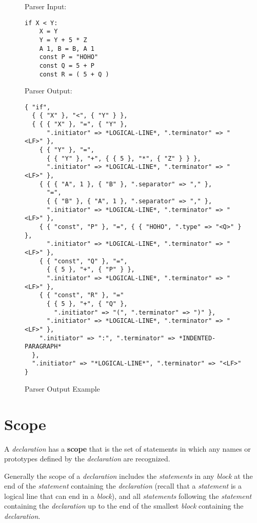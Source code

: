 \documentclass[12pt]{article}
\newcommand{\key}[1]{{\rm \bfseries #1}}
\newlength{\figurewidth}
\newenvironment{boxedfigure}[1][!btp]%
	{\begin{figure*}[#1]
	 \begin{lrbox}{\figurebox}
	 \begin{minipage}{\figurewidth}

	 \vspace*{1ex}}%
	{
	 \vspace*{1ex}

	 \end{minipage}
	 \end{lrbox}

	 \centering
	 \fbox{\hspace*{0.1in}\usebox{\figurebox}\hspace*{0.1in}}
	 \end{figure*}}
\newenvironment{indpar}[1][0.3in]%
	{\begin{list}{}%
		     {\setlength{\itemsep}{0in}%
		      \setlength{\topsep}{0in}%
		      \setlength{\parsep}{1ex}%
		      \setlength{\labelwidth}{#1}%
		      \setlength{\leftmargin}{#1}%
		      \addtolength{\leftmargin}{\labelsep}}%
	 \item}%
	{\end{list}}
\begin{document}
\begin{boxedfigure}[!p]
\begin{indpar}[1em]


Parser Input:
\begin{indpar}[1em]\begin{verbatim}
if X < Y:
    X = Y
    Y = Y + 5 * Z
    A 1, B = B, A 1
    const P = "HOHO"
    const Q = 5 + P
    const R = ( 5 + Q )
\end{verbatim}\end{indpar}

\medskip

Parser Output:
\begin{indpar}[1em]\begin{verbatim}
{ "if",
  { { "X" }, "<", { "Y" } },
  { { { "X" }, "=", { "Y" },
      ".initiator" => *LOGICAL-LINE*, ".terminator" => "<LF>" },
    { { "Y" }, "=",
      { { "Y" }, "+", { { 5 }, "*", { "Z" } } },
      ".initiator" => *LOGICAL-LINE*, ".terminator" => "<LF>" },
    { { { "A", 1 }, { "B" }, ".separator" => "," },
      "=",
      { { "B" }, { "A", 1 }, ".separator" => "," },
      ".initiator" => *LOGICAL-LINE*, ".terminator" => "<LF>" },
    { { "const", "P" }, "=", { { "HOHO", ".type" => "<Q>" } },
      ".initiator" => *LOGICAL-LINE*, ".terminator" => "<LF>" },
    { { "const", "Q" }, "=",
      { { 5 }, "+", { "P" } },
      ".initiator" => *LOGICAL-LINE*, ".terminator" => "<LF>" },
    { { "const", "R" }, "="
      { { 5 }, "+", { "Q" },
        ".initiator" => "(", ".terminator" => ")" },
      ".initiator" => *LOGICAL-LINE*, ".terminator" => "<LF>" },
    ".initiator" => ":", ".terminator" => *INDENTED-PARAGRAPH*
  },
  ".initiator" => "*LOGICAL-LINE*", ".terminator" => "<LF>"
}

\end{verbatim}\end{indpar}
\end{indpar}

\caption{Parser Output Example}
\label{PARSER-OUTPUT-EXAMPLE}
\end{boxedfigure}

\section{Scope}
\label{SCOPE}

A {\em declaration} has a \key{scope}
that is the set of statements in which any
names or prototypes defined by the {\em declaration}
are recognized.

Generally the scope of a {\em declaration} includes the {\em statements}
in any {\em block} at the end of the {\em statement}
containing the {\em declaration} (recall that a {\em statement} is a
logical line that can end in a {\em block}), and
all {\em statements} following the {\em statement} containing
the {\em declaration} up to the end of the smallest {\em block}
containing the {\em declaration}.
\end{document}
